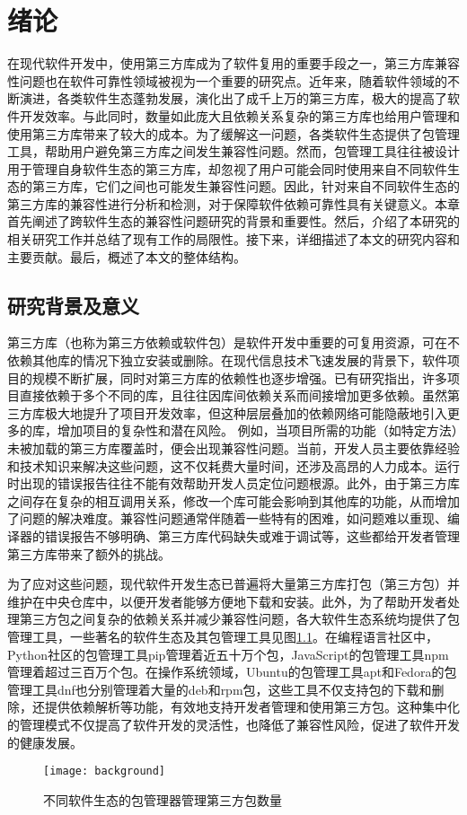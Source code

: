 \chapter{绪论}
在现代软件开发中，使用第三方库成为了软件复用的重要手段之一，第三方库兼容性问题也在软件可靠性领域被视为一个重要的研究点。近年来，随着软件领域的不断演进，各类软件生态蓬勃发展，演化出了成千上万的第三方库，极大的提高了软件开发效率。与此同时，数量如此庞大且依赖关系复杂的第三方库也给用户管理和使用第三方库带来了较大的成本。为了缓解这一问题，各类软件生态提供了包管理工具，帮助用户避免第三方库之间发生兼容性问题。然而，包管理工具往往被设计用于管理自身软件生态的第三方库，却忽视了用户可能会同时使用来自不同软件生态的第三方库，它们之间也可能发生兼容性问题。因此，针对来自不同软件生态的第三方库的兼容性进行分析和检测，对于保障软件依赖可靠性具有关键意义。本章首先阐述了跨软件生态的兼容性问题研究的背景和重要性。然后，介绍了本研究的相关研究工作并总结了现有工作的局限性。接下来，详细描述了本文的研究内容和主要贡献。最后，概述了本文的整体结构。

\section{研究背景及意义}
第三方库（也称为第三方依赖或软件包）是软件开发中重要的可复用资源，可在不依赖其他库的情况下独立安装或删除。在现代信息技术飞速发展的背景下，软件项目的规模不断扩展，同时对第三方库的依赖性也逐步增强。已有研究指出，许多项目直接依赖于多个不同的库，且往往因库间依赖关系而间接增加更多依赖。虽然第三方库极大地提升了项目开发效率，但这种层层叠加的依赖网络可能隐蔽地引入更多的库，增加项目的复杂性和潜在风险。
例如，当项目所需的功能（如特定方法）未被加载的第三方库覆盖时，便会出现兼容性问题。当前，开发人员主要依靠经验和技术知识来解决这些问题，这不仅耗费大量时间，还涉及高昂的人力成本。运行时出现的错误报告往往不能有效帮助开发人员定位问题根源。此外，由于第三方库之间存在复杂的相互调用关系，修改一个库可能会影响到其他库的功能，从而增加了问题的解决难度。兼容性问题通常伴随着一些特有的困难，如问题难以重现、编译器的错误报告不够明确、第三方库代码缺失或难于调试等，这些都给开发者管理第三方库带来了额外的挑战。

为了应对这些问题，现代软件开发生态已普遍将大量第三方库打包（第三方包）并维护在中央仓库中，以便开发者能够方便地下载和安装。此外，为了帮助开发者处理第三方包之间复杂的依赖关系并减少兼容性问题，各大软件生态系统均提供了包管理工具，一些著名的软件生态及其包管理工具见图\ref{fig:bac}。在编程语言社区中，Python社区的包管理工具pip管理着近五十万个包，JavaScript的包管理工具npm管理着超过三百万个包。在操作系统领域，Ubuntu的包管理工具apt和Fedora的包管理工具dnf也分别管理着大量的deb和rpm包，这些工具不仅支持包的下载和删除，还提供依赖解析等功能，有效地支持开发者管理和使用第三方包。这种集中化的管理模式不仅提高了软件开发的灵活性，也降低了兼容性风险，促进了软件开发的健康发展。
\begin{figure}[htbp]
	\centering
	\texttt{[image: background]}
	\caption{不同软件生态的包管理器管理第三方包数量}
	\label{fig:bac}
\end{figure}

